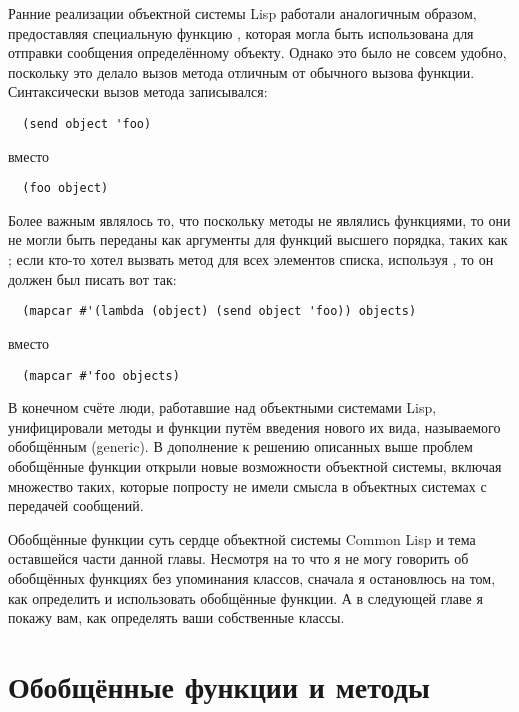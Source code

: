 Ранние реализации объектной системы Lisp работали аналогичным образом, предоставляя
специальную функцию , которая могла быть использована для отправки сообщения
определённому объекту.  Однако это было не совсем удобно, поскольку это делало вызов
метода отличным от обычного вызова функции.  Синтаксически вызов метода записывался:

\begin{lstlisting}
  (send object 'foo)
\end{lstlisting}

\noindent{}вместо

\begin{lstlisting}
  (foo object)
\end{lstlisting}

Более важным являлось то, что поскольку методы не являлись функциями, то они не могли быть
переданы как аргументы для функций высшего порядка, таких как ; если кто-то
хотел вызвать метод для всех элементов списка, используя , то он должен был
писать вот так:

\begin{lstlisting}
  (mapcar #'(lambda (object) (send object 'foo)) objects)
\end{lstlisting}

\noindent{}вместо

\begin{lstlisting}
  (mapcar #'foo objects)
\end{lstlisting}

В конечном счёте люди, работавшие над объектными системами Lisp, унифицировали методы и
функции путём введения нового их вида, называемого обобщённым (generic).  В дополнение к
решению описанных выше проблем обобщённые функции открыли новые возможности объектной
системы, включая множество таких, которые попросту не имели смысла в объектных системах с
передачей сообщений.

Обобщённые функции суть сердце объектной системы Common Lisp и тема оставшейся части
данной главы.  Несмотря на то что я не могу говорить об обобщённых функциях без
упоминания классов, сначала я остановлюсь на том, как определить и использовать обобщённые
функции.  А в следующей главе я покажу вам, как определять ваши собственные классы.

\section{Обобщённые функции и методы}

